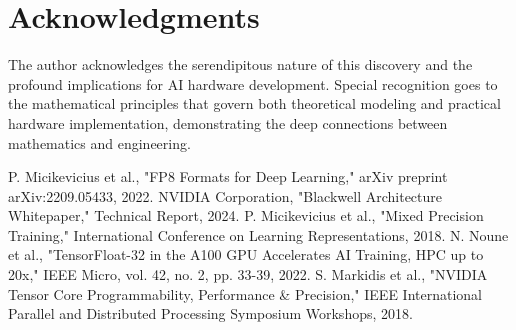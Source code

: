 \documentclass[conference]{IEEEtran}
\begin{document}
\section*{Acknowledgments}

The author acknowledges the serendipitous nature of this discovery and the profound implications for AI hardware development. Special recognition goes to the mathematical principles that govern both theoretical modeling and practical hardware implementation, demonstrating the deep connections between mathematics and engineering.

\begin{thebibliography}{00}
 P. Micikevicius et al., "FP8 Formats for Deep Learning," arXiv preprint arXiv:2209.05433, 2022.
 NVIDIA Corporation, "Blackwell Architecture Whitepaper," Technical Report, 2024.
 P. Micikevicius et al., "Mixed Precision Training," International Conference on Learning Representations, 2018.
 N. Noune et al., "TensorFloat-32 in the A100 GPU Accelerates AI Training, HPC up to 20x," IEEE Micro, vol. 42, no. 2, pp. 33-39, 2022.
 S. Markidis et al., "NVIDIA Tensor Core Programmability, Performance \& Precision," IEEE International Parallel and Distributed Processing Symposium Workshops, 2018.
\end{thebibliography}
\end{document}
